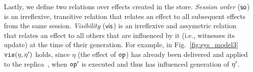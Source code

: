 Lastly, we define two relations over effects created in the store.
\emph{Session order} (${\textsf{so}}$) is an irreflexive, transitive relation
that relates an effect to all subsequent effects from the same
session.  \emph{Visibility} (${{\normalfont \textsf{vis}}}$) is an
irreflexive and assymetric relation that relates an effect to all
others that are influenced by it (i.e., witnesses its update) at the time of
their generation.  For example, in Fig.~\ref{fig:sys_model3} ${\normalfont \texttt{vis}}
(\eta,\eta')$ holds, since $\eta$ (the effect of ${\normalfont \texttt{op}}$) has already
been delivered and applied to the replica~, when ${\normalfont \texttt{op}}'$ is
executed and thus has influenced generation of $\eta'$.

















































































